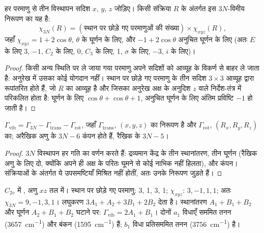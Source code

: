 \begin{proposition}[सभी गतियों का निरूपण]\label{prop:b3:group-theory-applied:gamma-3n}
हर परमाणु से तीन विस्थापन सदिश $x$, $y$, $z$ जोड़िए। किसी संक्रिया
$R$ के अंतर्गत इस $3N$-विमीय निरूपण का  यह है:
\[
\chi_{3N}(R) = (\text{स्थान पर छोड़े गए परमाणुओं की संख्या}) \times \chi_{xyz}(R),
\]
जहाँ $\chi_{xyz} = 1 + 2\cos\theta$, $\theta$ के घूर्णन के लिए, और $-1 + 2\cos\theta$
अनुचित घूर्णन के लिए (अतः $E$ के लिए 3, $-1$, $C_2$ के लिए, 0, $C_3$ के लिए, 1, $\sigma$ के लिए,
$-3$, $i$ के लिए)।
\end{proposition}

\begin{proof}
किसी अन्य स्थिति पर ले जाया गया परमाणु अपने सदिशों को आव्यूह के विकर्ण से बाहर ले
जाता है: अनुरेख में उसका कोई योगदान नहीं। स्थान पर छोड़े गए परमाणु के तीन सदिश
$3\times3$ आव्यूह द्वारा रूपांतरित होते हैं, जो $R$ का आव्यूह है और जिसका अनुरेख
अक्ष के अनुदिश $z$ वाले निर्देश-तंत्र में परिकलित होता है: घूर्णन के लिए $\cos\theta + \cos\theta + 1$,
अनुचित घूर्णन के लिए अंतिम प्रविष्टि $-1$ हो जाती है।
\end{proof}

\begin{proposition}[कंपनों की गिनती]\label{prop:b3:group-theory-applied:mode-count}
$\Gamma_{\mathrm{vib}} = \Gamma_{3N} - \Gamma_{\mathrm{trans}} - \Gamma_{\mathrm{rot}}$, जहाँ
$\Gamma_{\mathrm{trans}}$, $(x, y, z)$ का निरूपण है और $\Gamma_{\mathrm{rot}}$,
$(R_x, R_y, R_z)$ का; अरैखिक अणु के $3N - 6$ कंपन होते हैं, रैखिक
के $3N - 5$।
\end{proposition}

\begin{proof}
$3N$ विस्थापन हर गति का वर्णन करते हैं: द्रव्यमान केंद्र के तीन स्थानांतरण,
तीन घूर्णन (रैखिक अणु के लिए दो, क्योंकि अपने ही अक्ष के परितः घूमने से
कोई नाभिक नहीं हिलता), और कंपन। संक्रियाओं के अंतर्गत ये उपसमष्टियाँ
मिश्रित नहीं होतीं, अतः उनके निरूपण जुड़ते हैं।
\end{proof}

\begin{example}[जल]\label{ex:b3:group-theory-applied:water}
$C_{2v}$ में , अणु $xz$ तल में। स्थान पर छोड़े गए परमाणु: 3, 1, 3, 1;
$\chi_{xyz}$: $3, -1, 1, 1$; अतः $\chi_{3N} = 9, -1, 3, 1$। लघुकरण $3A_1 +
A_2 + 3B_1 + 2B_2$ देता है। स्थानांतरण $A_1 + B_1 + B_2$ और घूर्णन $A_2 + B_1 + B_2$
घटाने पर: $\Gamma_{\mathrm{vib}} = 2A_1 + B_1$। दोनों $a_1$ विधाएँ सममित
तनन (\qty{3657}{cm^{-1}}) और बंकन (\qty{1595}{cm^{-1}}) हैं; $b_1$ विधा
प्रतिसममित तनन (\qty{3756}{cm^{-1}}) है।
\end{example}

